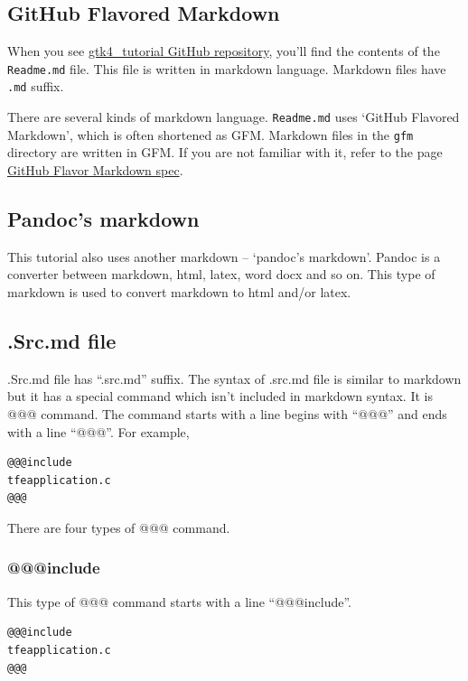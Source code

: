 \subsection{GitHub Flavored Markdown}\label{github-flavored-markdown}

When you see
\href{https://github.com/ToshioCP/Gtk4-tutorial}{gtk4\_tutorial GitHub
repository}, you'll find the contents of the \texttt{Readme.md} file.
This file is written in markdown language. Markdown files have
\texttt{.md} suffix.

There are several kinds of markdown language. \texttt{Readme.md} uses
`GitHub Flavored Markdown', which is often shortened as GFM. Markdown
files in the \texttt{gfm} directory are written in GFM. If you are not
familiar with it, refer to the page
\href{https://github.github.com/gfm/}{GitHub Flavor Markdown spec}.

\subsection{Pandoc's markdown}\label{pandocs-markdown}

This tutorial also uses another markdown -- `pandoc's markdown'. Pandoc
is a converter between markdown, html, latex, word docx and so on. This
type of markdown is used to convert markdown to html and/or latex.

\subsection{.Src.md file}\label{src.md-file}

.Src.md file has ``.src.md'' suffix. The syntax of .src.md file is
similar to markdown but it has a special command which isn't included in
markdown syntax. It is @@@ command. The command starts with a line
begins with ``@@@'' and ends with a line ``@@@''. For example,

\begin{verbatim}
@@@include
tfeapplication.c
@@@
\end{verbatim}

There are four types of @@@ command.

\subsubsection{@@@include}\label{include}

This type of @@@ command starts with a line ``@@@include''.

\begin{verbatim}
@@@include
tfeapplication.c
@@@
\end{verbatim}


